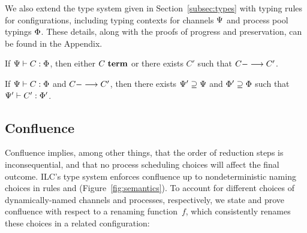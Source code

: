 We also extend the type system given in Section~\ref{subsec:types} with typing
rules for configurations, including typing contexts for channels $\ChTy$ and
process pool typings $\PrTy$. These details, along with the proofs of progress
and preservation, can be found in the Appendix.
%
%



\begin{theorem}[Progress]
If $\JCty{\StTy}{\ChTy}{C}{\PrTy}$, then either $\JCterm{C}$ or there exists
$C'$ such that $\JCred{C}{C'}$.
\end{theorem}

\begin{theorem}[Preservation]
If $\JCty{\StTy}{\ChTy}{C}{\PrTy}$ and $\JCred{C}{C'}$, then there exists
$\ChTy' \supseteq \ChTy$ and $\PrTy' \supseteq \PrTy$ such that
$\JCty{\StTy'}{\ChTy'}{C'}{\PrTy'}$.
\end{theorem}

\subsection{Confluence}

Confluence implies, among other things, that the order of reduction steps is
inconsequential, and that no process scheduling choices will affect
the final outcome. ILC's type system enforces confluence 
up to nondeterministic naming choices in 
rules  and  (Figure~\ref{fig:semantics}).
%
To account for different choices of dynamically-named channels and processes, respectively, 
we state and prove confluence
with respect to a renaming function~$f$, which consistently renames
these choices in a related configuration:

